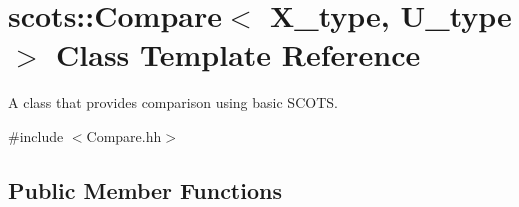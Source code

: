 \hypertarget{classscots_1_1Compare}{}\section{scots\+:\+:Compare$<$ X\+\_\+type, U\+\_\+type $>$ Class Template Reference}
\label{classscots_1_1Compare}


A class that provides comparison using basic S\+C\+O\+TS.  




{\ttfamily \#include $<$Compare.\+hh$>$}

\subsection*{Public Member Functions}
